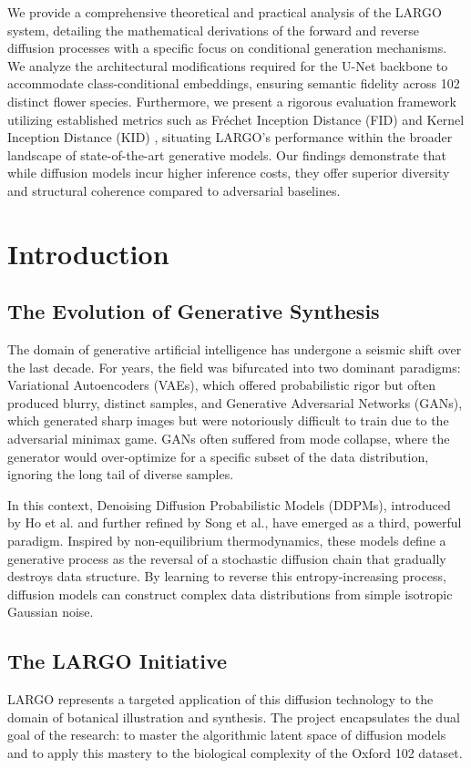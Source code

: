\documentclass[12pt, a4paper]{article}
\begin{document}
We provide a comprehensive theoretical and practical analysis of the LARGO system, detailing the mathematical derivations of the forward and reverse diffusion processes with a specific focus on conditional generation mechanisms. We analyze the architectural modifications required for the U-Net backbone to accommodate class-conditional embeddings, ensuring semantic fidelity across 102 distinct flower species. Furthermore, we present a rigorous evaluation framework utilizing established metrics such as Fréchet Inception Distance (FID) and Kernel Inception Distance (KID) \cite{softwaremill}, situating LARGO’s performance within the broader landscape of state-of-the-art generative models. Our findings demonstrate that while diffusion models incur higher inference costs, they offer superior diversity and structural coherence compared to adversarial baselines.
\section{Introduction}

\subsection{The Evolution of Generative Synthesis}
The domain of generative artificial intelligence has undergone a seismic shift over the last decade. For years, the field was bifurcated into two dominant paradigms: Variational Autoencoders (VAEs), which offered probabilistic rigor but often produced blurry, distinct samples, and Generative Adversarial Networks (GANs), which generated sharp images but were notoriously difficult to train due to the adversarial minimax game. GANs often suffered from mode collapse, where the generator would over-optimize for a specific subset of the data distribution, ignoring the long tail of diverse samples.

In this context, Denoising Diffusion Probabilistic Models (DDPMs), introduced by Ho et al. \cite{ho2020} and further refined by Song et al., have emerged as a third, powerful paradigm. Inspired by non-equilibrium thermodynamics, these models define a generative process as the reversal of a stochastic diffusion chain that gradually destroys data structure. By learning to reverse this entropy-increasing process, diffusion models can construct complex data distributions from simple isotropic Gaussian noise.

\subsection{The LARGO Initiative}
LARGO represents a targeted application of this diffusion technology to the domain of botanical illustration and synthesis. The project encapsulates the dual goal of the research: to master the algorithmic latent space of diffusion models and to apply this mastery to the biological complexity of the Oxford 102 dataset.
\end{document}
